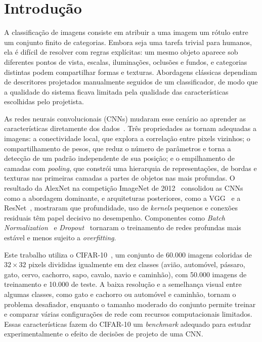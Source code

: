
\section{Introdução}

A classificação de imagens consiste em atribuir a uma imagem um rótulo entre um
conjunto finito de categorias. Embora seja uma tarefa trivial para humanos, ela
é difícil de resolver com regras explícitas: um mesmo objeto aparece sob
diferentes pontos de vista, escalas, iluminações, oclusões e fundos, e
categorias distintas podem compartilhar formas e texturas. Abordagens clássicas
dependiam de descritores projetados manualmente seguidos de um classificador,
de modo que a qualidade do sistema ficava limitada pela qualidade das
características escolhidas pelo projetista.

As redes neurais convolucionais (CNNs) mudaram esse cenário ao aprender as
características diretamente dos dados~\cite{lecun1998gradient}. Três
propriedades as tornam adequadas a imagens: a conectividade local, que explora
a correlação entre pixels vizinhos; o compartilhamento de pesos, que reduz o
número de parâmetros e torna a detecção de um padrão independente de sua
posição; e o empilhamento de camadas com \textit{pooling}, que constrói uma
hierarquia de representações, de bordas e texturas nas primeiras camadas a
partes de objetos nas mais profundas. O resultado da AlexNet na competição
ImageNet de 2012~\cite{krizhevsky2012imagenet} consolidou as CNNs como a
abordagem dominante, e arquiteturas posteriores, como a
VGG~\cite{simonyan2015very} e a ResNet~\cite{he2016deep}, mostraram que
profundidade, uso de \textit{kernels} pequenos e conexões residuais têm papel
decisivo no desempenho. Componentes como \textit{Batch
Normalization}~\cite{ioffe2015batch} e \textit{Dropout}~\cite{srivastava2014dropout}
tornaram o treinamento de redes profundas mais estável e menos sujeito a
\textit{overfitting}.

Este trabalho utiliza o CIFAR-10~\cite{krizhevsky2009learning}, um conjunto de
60.000 imagens coloridas de $32 \times 32$ pixels divididas igualmente em dez
classes (avião, automóvel, pássaro, gato, cervo, cachorro, sapo, cavalo, navio
e caminhão), com 50.000 imagens de treinamento e 10.000 de teste. A baixa
resolução e a semelhança visual entre algumas classes, como gato e cachorro ou
automóvel e caminhão, tornam o problema desafiador, enquanto o tamanho moderado
do conjunto permite treinar e comparar várias configurações de rede com
recursos computacionais limitados. Essas características fazem do CIFAR-10 um
\textit{benchmark} adequado para estudar experimentalmente o efeito de
decisões de projeto de uma CNN.

